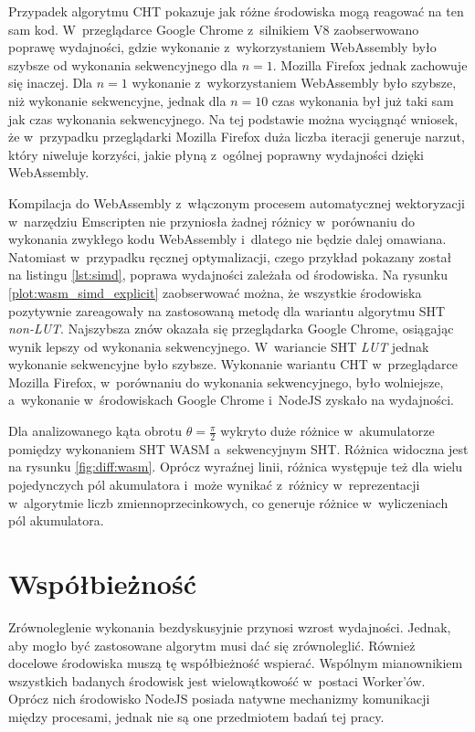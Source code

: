 Przypadek algorytmu CHT pokazuje jak różne środowiska mogą reagować na ten sam kod. W~przeglądarce Google Chrome z~silnikiem V8 zaobserwowano poprawę wydajności, gdzie wykonanie z~wykorzystaniem WebAssembly było  szybsze od wykonania sekwencyjnego dla $n = 1$. Mozilla Firefox jednak zachowuje się inaczej. Dla $n = 1$ wykonanie z~wykorzystaniem WebAssembly było  szybsze, niż wykonanie sekwencyjne, jednak dla $n = 10$ czas wykonania był już taki sam jak czas wykonania sekwencyjnego. Na tej podstawie można wyciągnąć wniosek, że w~przypadku przeglądarki Mozilla Firefox duża liczba iteracji generuje narzut, który niweluje korzyści, jakie płyną z~ogólnej poprawny wydajności dzięki WebAssembly. 

Kompilacja do WebAssembly z~włączonym procesem automatycznej wektoryzacji w~narzędziu Emscripten nie przyniosła żadnej różnicy w~porównaniu do wykonania zwykłego kodu WebAssembly i~dlatego nie będzie dalej omawiana. Natomiast w~przypadku ręcznej optymalizacji, czego przykład pokazany został na listingu \ref{lst:simd}, poprawa wydajności zależała od środowiska. Na rysunku \ref{plot:wasm_simd_explicit} zaobserwować można, że wszystkie środowiska pozytywnie zareagowały na zastosowaną metodę dla wariantu algorytmu SHT \textit{non-LUT}. Najszybsza znów okazała się przeglądarka Google Chrome, osiągając wynik  lepszy od wykonania sekwencyjnego. W~wariancie SHT \textit{LUT} jednak wykonanie sekwencyjne było  szybsze. Wykonanie wariantu CHT w~przeglądarce Mozilla Firefox, w~porównaniu do wykonania sekwencyjnego, było wolniejsze, a~wykonanie w~środowiskach Google Chrome i~NodeJS zyskało na wydajności.

Dla analizowanego kąta obrotu $\theta = \frac{\pi}{2}$ wykryto duże różnice w~akumulatorze pomiędzy wykonaniem SHT WASM a~sekwencyjnym SHT. Różnica widoczna jest na rysunku \ref{fig:diff:wasm}. Oprócz wyraźnej linii, różnica występuje też dla wielu pojedynczych pól akumulatora i~może wynikać z~różnicy w~reprezentacji w~algorytmie liczb zmiennoprzecinkowych, co generuje różnice w~wyliczeniach pól akumulatora.

\section{Współbieżność}

Zrównoleglenie wykonania bezdyskusyjnie przynosi wzrost wydajności. Jednak, aby mogło być zastosowane algorytm musi dać się zrównoleglić. Również docelowe środowiska muszą tę współbieżność wspierać. Wspólnym mianownikiem wszystkich badanych środowisk jest wielowątkowość w~postaci Worker'ów. Oprócz nich środowisko NodeJS posiada natywne mechanizmy komunikacji między procesami, jednak nie są one przedmiotem badań tej pracy.

